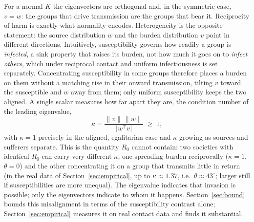\documentclass[12pt]{article}
\begin{document}
For a normal $K$ the eigenvectors are orthogonal and, in the symmetric case, $v=w$: the groups that drive transmission are the groups that bear it. Reciprocity of harm is exactly what normality encodes. Heterogeneity is the opposite statement: the source distribution $w$ and the burden distribution $v$ point in
different directions. Intuitively, susceptibility governs how readily a group is \emph{infected}, a sink property that raises its burden, not how much it goes on to \emph{infect others}, which under reciprocal contact and uniform infectiousness is set separately. Concentrating susceptibility in some groups therefore places a burden on them without a matching rise in their onward transmission, tilting $v$ toward the susceptible and $w$ away from them; only uniform susceptibility keeps the two aligned. A single scalar measures how far apart they are, the condition number of the leading eigenvalue,
\begin{equation}
\kappa=\frac{\lVert v\rVert\,\lVert w\rVert}{\lvert w^{\top}v\rvert}\;\ge\;1,
\end{equation}
with $\kappa=1$ precisely in the aligned, egalitarian case and $\kappa$ growing as sources and sufferers separate. This is the quantity $R_0$ cannot contain: two societies with identical $R_0$ can carry very different $\kappa$, one spreading burden reciprocally ($\kappa=1$, $\theta=0$) and the other concentrating it on a group that transmits little in return (in the real data of Section~\ref{sec:empirical}, up to $\kappa\approx1.37$, i.e.\ $\theta\approx43^{\circ}$; larger still if susceptibilities are more unequal). The eigenvalue indicates that invasion is possible; only the eigenvectors indicate to whom it happens. Section~\ref{sec:bound} bounds this misalignment in terms of the susceptibility contrast alone; Section~\ref{sec:empirical} measures it on real contact data and finds it substantial.
\end{document}
